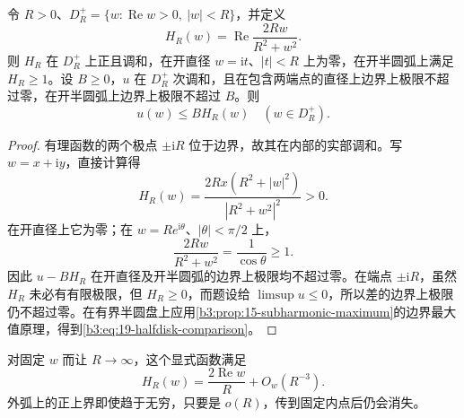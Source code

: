 \begin{lemma}[右半圆盘的比较函数]\label{b3:lem:19-halfdisk-barrier}
令 \(R>0\)、\(D_R^+=\{w:\operatorname{Re}w>0,\ |w|<R\}\)，并定义
\[
 H_R(w)=\operatorname{Re}\frac{2Rw}{R^2+w^2}.
\]
则 \(H_R\) 在 \(D_R^+\) 上正且调和，在开直径 \(w=\mathrm it\)、\(|t|<R\) 上为零，在开半圆弧上满足 \(H_R\ge1\)。设 \(B\ge0\)，\(u\) 在 \(D_R^+\) 次调和，且在包含两端点的直径上边界上极限不超过零，在开半圆弧上边界上极限不超过 \(B\)。则
\begin{equation}\label{b3:eq:19-halfdisk-comparison}
 u(w)\le B H_R(w)\quad(w\in D_R^+).
\end{equation}
\end{lemma}
\begin{proof}
有理函数的两个极点 \(\pm\mathrm iR\) 位于边界，故其在内部的实部调和。写 \(w=x+\mathrm iy\)，直接计算得
\[
 H_R(w)=\frac{2Rx(R^2+|w|^2)}{|R^2+w^2|^2}>0.
\]
在开直径上它为零；在 \(w=Re^{\mathrm i\theta}\)、\(|\theta|<\pi/2\) 上，
\[
 \frac{2Rw}{R^2+w^2}=\frac1{\cos\theta}\ge1.
\]
因此 \(u-BH_R\) 在开直径及开半圆弧的边界上极限均不超过零。在端点 \(\pm\mathrm iR\)，虽然 \(H_R\) 未必有有限极限，但 \(H_R\ge0\)，而题设给 \(\limsup u\le0\)，所以差的边界上极限仍不超过零。在有界半圆盘上应用\cref{b3:prop:15-subharmonic-maximum}的边界最大值原理，得到\eqref{b3:eq:19-halfdisk-comparison}。
\end{proof}

对固定 \(w\) 而让 \(R\to\infty\)，这个显式函数满足
\begin{equation}\label{b3:eq:19-barrier-decay}
 H_R(w)=\frac{2\operatorname{Re}w}{R}+O_w(R^{-3}).
\end{equation}
外弧上的正上界即使趋于无穷，只要是 \(o(R)\)，传到固定内点后仍会消失。

